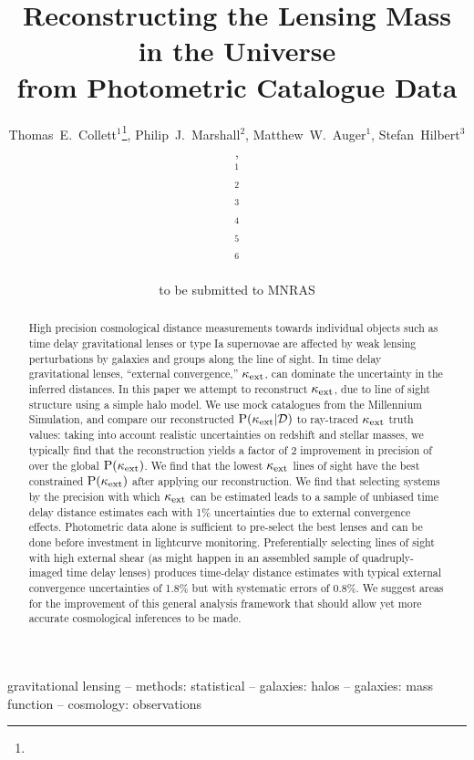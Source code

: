 \documentclass[useAMS,usenatbib,a4paper]{mn2e}
\title[Line of Sight Mass Reconstruction]
{Reconstructing the Lensing Mass in the Universe \\
from Photometric Catalogue Data}
\author[Collett \etal]{%
  Thomas~E.~Collett$^{1}$\thanks{\collettemail},
  Philip~J.~Marshall$^{2}$,
  Matthew~W.~Auger$^{1}$,
  Stefan~Hilbert$^{3}$,
\newauthor{%
  Sherry~H.~Suyu$^{4}$,
  Zachary~Greene$^{4}$,
  Tommaso~Treu$^{4}$\thanks{\packard},}
\newauthor{%
  Christopher~D.~Fassnacht$^{5}$,
  L\'eon~V.~E.~Koopmans$^{6}$,
  Roger~D.~Blandford$^{3}$} 
  \medskip\\
  $^1$\ioa\\
  $^2$\oxford\\
  $^3$\kipac\\
  $^4$\ucsb\\
  $^5$\davis\\
  $^6$\kapteyn
}
\begin{document}
             
\date{to be submitted to MNRAS}
\pagerange{\pageref{firstpage}--\pageref{lastpage}}

\maketitle           

\label{firstpage}


\begin{abstract} 

High precision cosmological distance measurements towards individual objects
such as time delay gravitational lenses or type Ia supernovae are affected by
weak lensing perturbations by galaxies and groups along the line of sight.
In time delay gravitational lenses,
``external convergence,'' $\kappa_{\rm ext}$, can dominate the uncertainty in the inferred distances.
In this paper we attempt to reconstruct $\kappa_{\rm ext}$,
due to line of sight structure using a simple halo model.
 We use mock catalogues from the Millennium Simulation, and compare
our reconstructed ${\rm P}(\kappa_{\rm ext}|{\mathcal{D}})$ to ray-traced $\kappa_{\rm ext}$ truth values: 
taking into account realistic uncertainties on redshift and stellar masses, we
typically find that the reconstruction yields a factor of 2 improvement in precision of
over the global ${\rm P}(\kappa_{\rm ext})$. We find that the lowest $\kappa_{\rm ext}$ lines of sight have the best constrained 
${\rm P}(\kappa_{\rm ext})$ after applying our reconstruction. We find that selecting systems by the precision with which
$\kappa_{\rm ext}$ can be estimated leads to a sample of unbiased
time delay distance estimates each with 1\% uncertainties due to external convergence effects.
Photometric data alone is sufficient to pre-select the best lenses and can be done
before investment in lightcurve monitoring. Preferentially selecting lines of
sight with high external shear (as might happen in an assembled sample of
quadruply-imaged time delay lenses) produces time-delay distance estimates with
typical external convergence uncertainties of 1.8\% but with systematic errors of 0.8\%.
We suggest areas for the improvement of this general analysis framework that
should allow yet more accurate cosmological inferences to be made.
\end{abstract}


\begin{keywords}
  gravitational lensing   --
  methods: statistical    --
  galaxies: halos         --
  galaxies: mass function  --
  cosmology: observations
\end{keywords}
\end{document}
